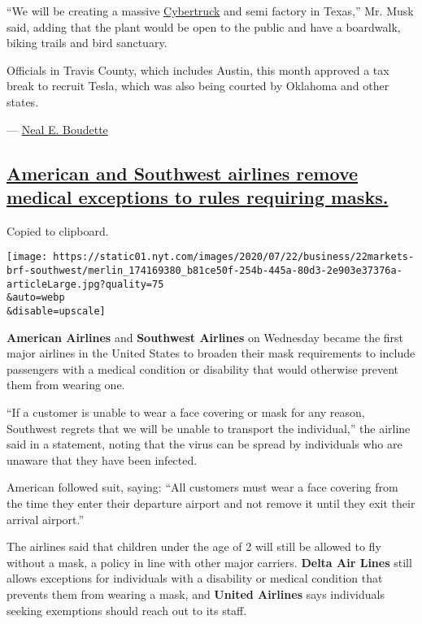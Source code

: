 ``We will be creating a massive
\href{https://www.nytimes.com/2019/11/21/business/tesla-cybertruck-pickup-truck.html}{Cybertruck}
and semi factory in Texas,'' Mr. Musk said, adding that the plant would
be open to the public and have a boardwalk, biking trails and bird
sanctuary.

Officials in Travis County, which includes Austin, this month approved a
tax break to recruit Tesla, which was also being courted by Oklahoma and
other states.

--- \href{https://www.nytimes.com/by/neal-e-boudette}{Neal E. Boudette}

\hypertarget{american-and-southwest-airlines-remove-medical-exceptions-to-rules-requiring-masks}{%
\subsection{\texorpdfstring{\protect\hyperlink{southwest-airlines-mask-policy}{American
and Southwest airlines remove medical exceptions to rules requiring
masks.}}{American and Southwest airlines remove medical exceptions to rules requiring masks.}}\label{american-and-southwest-airlines-remove-medical-exceptions-to-rules-requiring-masks}}

Copied to clipboard.

\texttt{[image: https://static01.nyt.com/images/2020/07/22/business/22markets-brf-southwest/merlin\_174169380\_b81ce50f-254b-445a-80d3-2e903e37376a-articleLarge.jpg?quality=75\\\&auto=webp\\\&disable=upscale]}

\textbf{American Airlines} and \textbf{Southwest Airlines} on Wednesday
became the first major airlines in the United States to broaden their
mask requirements to include passengers with a medical condition or
disability that would otherwise prevent them from wearing one.

``If a customer is unable to wear a face covering or mask for any
reason, Southwest regrets that we will be unable to transport the
individual,'' the airline said in a statement, noting that the virus can
be spread by individuals who are unaware that they have been infected.

American followed suit, saying: ``All customers must wear a face
covering from the time they enter their departure airport and not remove
it until they exit their arrival airport.''

The airlines said that children under the age of 2 will still be allowed
to fly without a mask, a policy in line with other major carriers.
\textbf{Delta Air Lines} still allows exceptions for individuals with a
disability or medical condition that prevents them from wearing a mask,
and \textbf{United Airlines} says individuals seeking exemptions should
reach out to its staff.

